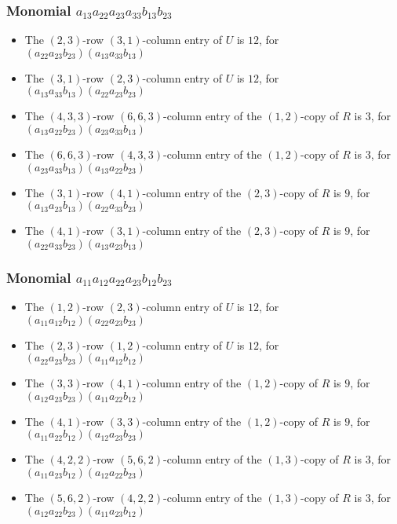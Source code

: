 \documentclass{article}
\begin{document}
\subsubsection{Monomial $ a_{13} a_{22} a_{23} a_{33} b_{13} b_{23} $}

\begin{itemize}
\item The $ \left(2, 3\right) $-row $ \left(3, 1\right) $-column entry of $U$ is $ 12 $, for $( a_{22} a_{23} b_{23} )( a_{13} a_{33} b_{13} )$ 
\item The $ \left(3, 1\right) $-row $ \left(2, 3\right) $-column entry of $U$ is $ 12 $, for $( a_{13} a_{33} b_{13} )( a_{22} a_{23} b_{23} )$ 
\item The $(4, 3, 3)$-row $(6, 6, 3)$-column entry of the $ \left(1, 2\right) $-copy of $R$ is $ 3 $, for $( a_{13} a_{22} b_{23} )( a_{23} a_{33} b_{13} )$ 
\item The $(6, 6, 3)$-row $(4, 3, 3)$-column entry of the $ \left(1, 2\right) $-copy of $R$ is $ 3 $, for $( a_{23} a_{33} b_{13} )( a_{13} a_{22} b_{23} )$ 
\item The $(3, 1)$-row $(4, 1)$-column entry of the $ \left(2, 3\right) $-copy of $R$ is $ 9 $, for $( a_{13} a_{23} b_{13} )( a_{22} a_{33} b_{23} )$ 
\item The $(4, 1)$-row $(3, 1)$-column entry of the $ \left(2, 3\right) $-copy of $R$ is $ 9 $, for $( a_{22} a_{33} b_{23} )( a_{13} a_{23} b_{13} )$ 
\end{itemize}
\subsubsection{Monomial $ a_{11} a_{12} a_{22} a_{23} b_{12} b_{23} $}

\begin{itemize}
\item The $ \left(1, 2\right) $-row $ \left(2, 3\right) $-column entry of $U$ is $ 12 $, for $( a_{11} a_{12} b_{12} )( a_{22} a_{23} b_{23} )$ 
\item The $ \left(2, 3\right) $-row $ \left(1, 2\right) $-column entry of $U$ is $ 12 $, for $( a_{22} a_{23} b_{23} )( a_{11} a_{12} b_{12} )$ 
\item The $(3, 3)$-row $(4, 1)$-column entry of the $ \left(1, 2\right) $-copy of $R$ is $ 9 $, for $( a_{12} a_{23} b_{23} )( a_{11} a_{22} b_{12} )$ 
\item The $(4, 1)$-row $(3, 3)$-column entry of the $ \left(1, 2\right) $-copy of $R$ is $ 9 $, for $( a_{11} a_{22} b_{12} )( a_{12} a_{23} b_{23} )$ 
\item The $(4, 2, 2)$-row $(5, 6, 2)$-column entry of the $ \left(1, 3\right) $-copy of $R$ is $ 3 $, for $( a_{11} a_{23} b_{12} )( a_{12} a_{22} b_{23} )$ 
\item The $(5, 6, 2)$-row $(4, 2, 2)$-column entry of the $ \left(1, 3\right) $-copy of $R$ is $ 3 $, for $( a_{12} a_{22} b_{23} )( a_{11} a_{23} b_{12} )$ 
\end{itemize}
\end{document}
